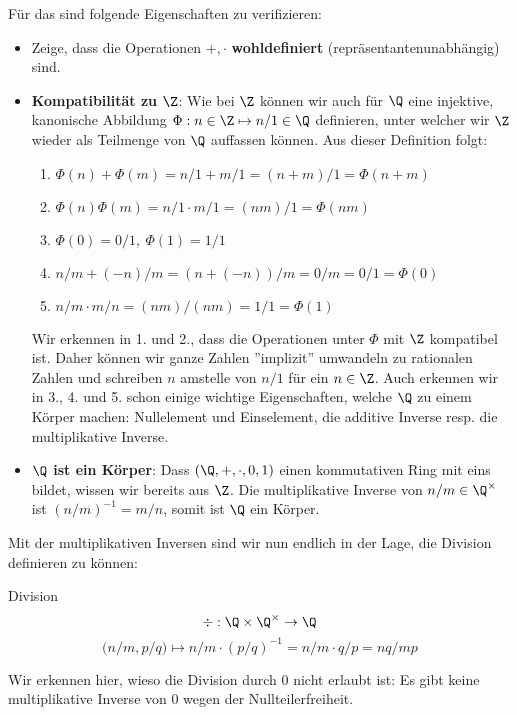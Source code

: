 Für das sind folgende Eigenschaften zu verifizieren:
\begin{itemize}
    \item Zeige, dass die Operationen $+, \cdot$ \textbf{wohldefiniert} (repräsentantenunabhängig) sind.
    \item \textbf{Kompatibilität zu $\Z$}: Wie bei $\Z$ können wir auch für $\Q$ eine injektive, kanonische Abbildung $\Phi: n \in \Z \mapsto n/1 \in \Q$ definieren, unter welcher wir $\Z$ wieder als Teilmenge von $\Q$ auffassen können. Aus dieser Definition folgt:
    \begin{enumerate}
        \item $\Phi(n)+\Phi(m)=n/1 + m/1 = (n+m)/1 = \Phi(n+m)$
        \item $\Phi(n)\Phi(m)=n/1 \cdot m/1 = (nm)/1 = \Phi(nm)$
        \item $\Phi(0) = 0/1,\ \Phi(1) = 1/1$
        \item $n/m + (-n)/m = (n+(-n))/m = 0/m = 0/1 = \Phi(0)$
        \item $n/m \cdot m/n = (nm)/(nm) = 1/1 = \Phi(1)$
    \end{enumerate}
    Wir erkennen in 1. und 2., dass die Operationen unter $\Phi$ mit $\Z$ kompatibel ist. Daher können wir ganze Zahlen ''implizit'' umwandeln zu rationalen Zahlen und schreiben $n$ amstelle von $n/1$ für ein $n\in \Z$. Auch erkennen wir in 3., 4. und 5. schon einige wichtige Eigenschaften, welche $\Q$ zu einem Körper machen: Nullelement und Einselement, die additive Inverse resp. die multiplikative Inverse.
    \item \textbf{$\Q$ ist ein Körper}: Dass $(\Q, +, \cdot, 0, 1)$ einen kommutativen Ring mit eins bildet, wissen wir bereits aus $\Z$. Die multiplikative Inverse von $n/m \in \Q^\times$ ist $(n/m)^{-1} = m/n$, somit ist $\Q$ ein Körper.
\end{itemize}
Mit der multiplikativen Inversen sind wir nun endlich in der Lage, die Division definieren  zu können:
\begin{definition}{Division}{}
    $$\div: \Q \times \Q^\times \to \Q\\$$
    $$\big(n/m, p/q\big) \mapsto n/m \cdot (p/q)^{-1} = n/m \cdot q/p = nq/mp$$
\end{definition}
\begin{remark}
Wir erkennen hier, wieso die Division durch 0 nicht erlaubt ist: Es gibt keine multiplikative Inverse von 0 wegen der Nullteilerfreiheit.
\end{remark}

